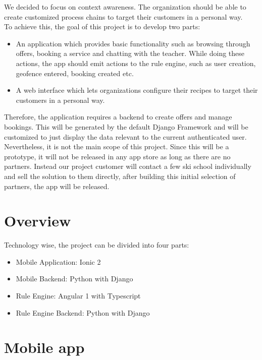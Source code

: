 \documentclass[11pt]{article} %
\begin{document}
\vspace{0.5cm}
We decided to focus on context awareness. The organization should be able to create customized process chains to target their customers in a personal way.\\
To achieve this, the goal of this project is to develop two parts:

\begin{itemize}
  \item An application which provides basic functionality such as browsing through offers, booking a service and chatting with the teacher. While doing these actions, the app should emit actions to the rule engine, such as user creation, geofence entered, booking created etc.
  \item A web interface which lets organizations configure their recipes to target their customers in a personal way.
\end{itemize}

Therefore, the application requires a backend to create offers and manage bookings. This will be generated by the default Django Framework and will be customized to just display the data relevant to the current authenticated user. Nevertheless, it is not the main scope of this project. Since this will be a prototype, it will not be released in any app store as long as there are no partners. Instead our project customer will contact a few ski school individually and sell the solution to them directly, after building this initial selection of partners, the app will be released.

\newpage

\section{Overview}

Technology wise, the project can be divided into four parts:

\begin{itemize}
  \item Mobile Application: Ionic 2
  \item Mobile Backend: Python with Django
  \item Rule Engine: Angular 1 with Typescript
  \item Rule Engine Backend: Python with Django
\end{itemize}

\newpage

\section{Mobile app}
\end{document}
